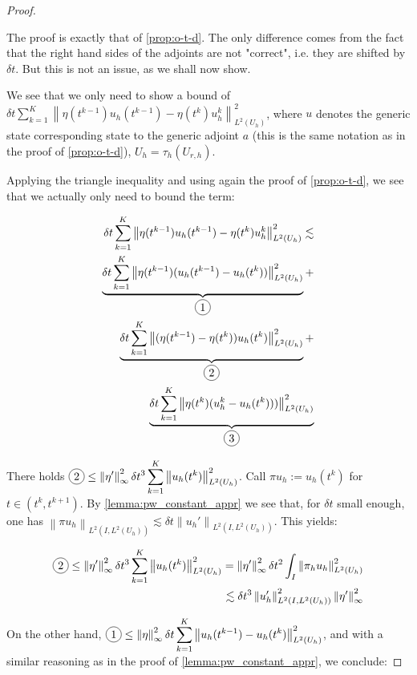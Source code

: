 \documentclass[english,a4paper,9pt,oneside]{scrbook}	%
\theoremstyle{break}
\newenvironment{mproof}[1][\proofname]{%
  \begin{proof}[#1]$ $\par\nobreak\ignorespaces
}{%
  \end{proof}
}
\renewcommand*{\proofname}{Proof}
\theoremstyle{remark}
\newcommand{\ds}{\displaystyle}
\newcommand{\norm}[1]{\left\lVert#1\right\rVert}
\newcommand*\circled[1]{\tikz[baseline=(char.base)]{
            \node[shape=circle,draw,inner sep=2pt] (char) {#1};}}
\begin{document}
\begin{mproof}
The proof is exactly that of \cref{prop:o-t-d}. The only difference comes from the fact that the right hand sides of the adjoints are not "correct", i.e. they are shifted by $\delta t$. But this is not an issue, as we shall now show. 

We see that we only need to show a bound of  $\delta t \sum_{k=1}^{K}\norm{\eta(t^{k-1})u_h(t^{k-1})-\eta(t^k)u_h^{k}}^2_{L^2(U_h)}$, where $u$ denotes the generic state corresponding state to the generic adjoint $a$ (this is the same notation as in the proof of \cref{prop:o-t-d}), $U_h=\tau_h(U_{r,h})$.

Applying the triangle inequality and using again the proof of \cref{prop:o-t-d}, we see that we actually only need to bound the term:

\begin{align*}
\delta t \sum_{k=1}^{K}\norm{\eta(t^{k-1})u_h(t^{k-1})-\eta(t^k)u_h^k}^2_{L^2(U_h)}\lesssim\\
\underbrace{\delta t \sum_{k=1}^{K}\norm{\eta(t^{k-1})(u_h(t^{k-1})-u_h(t^{k}))}^2_{L^2(U_h)}}_{\circled{1}}+\\
\underbrace{\delta t \sum_{k=1}^{K}\norm{(\eta(t^{k-1})-\eta(t^k))u_h(t^{k})}^2_{L^2(U_h)}}_{\circled{2}}+\\
\underbrace{\delta t \sum_{k=1}^{K}\norm{\eta(t^k)(u_h^k-u_h(t^k)))}^2_{L^2(U_h)}}_{\circled{3}}
\end{align*}

There holds $\ds  \circled{2} \leq \norm{\eta'}_\infty^2 \delta t^3 \sum_{k=1}^{K}\norm{u_h(t^{k})}^2_{L^2(U_h)}$. Call $\pi u_h := u_h(t^{k})$ for $t \in (t^k, t^{k+1})$. By \cref{lemma:pw_constant_appr} we see that, for $\delta t $ small enough, one has $\norm{\pi u_h}_{L^2(I, L^2(U_h))} \lesssim \delta t \norm{u_h'}_{L^2(I,L^2(U_h))}$. This yields:

\begin{align*}
	 \ds  \circled{2}\leq \norm{\eta'}_\infty^2 \delta t^3 \sum_{k=1}^{K}\norm{u_h(t^{k})}^2_{L^2(U_h)}  = \norm{\eta'}_\infty^2 \delta t^2 \int_I \norm{\pi_h u_h}^2_{L^2(U_h)}\\\lesssim \delta t^3 \norm{u_h'}_{L^2(I,L^2(U_h))}^2 \norm{\eta'}_\infty ^2
\end{align*}

On the other hand,  $\ds  \circled{1} \leq \norm{\eta}_\infty^2 \delta t \sum_{k=1}^{K}\norm{u_h(t^{k-1})-u_h(t^{k})}^2_{L^2(U_h)}$, and with a similar reasoning as in the proof of \cref{lemma:pw_constant_appr}, we conclude:


\end{mproof}
\end{document}
